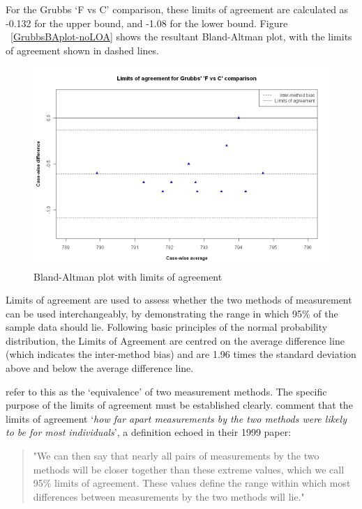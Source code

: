 \documentclass[12pt, a4paper]{report}
\theoremstyle{plain}
\theoremstyle{definition}
\theoremstyle{remark}
\begin{document}
For the Grubbs `F vs C' comparison, these limits
of agreement are calculated as -0.132 for the upper bound, and
-1.08 for the lower bound. Figure ~\ref{GrubbsBAplot-noLOA} shows the resultant
Bland-Altman plot, with the limits of agreement shown in dashed
lines.


\begin{figure}[h!]
	\begin{center}
		\includegraphics[width=125mm]{images/GrubbsBAplot-LOA.jpeg}
		\caption{Bland-Altman plot with limits of agreement}
	\end{center}
\end{figure}

Limits of agreement are used to assess whether the two methods of
measurement can be used interchangeably, by demonstrating the range in which 95\% of the sample data should lie. Following basic principles of the normal probability distribution, the Limits of Agreement are centred on the average difference line (which indicates the inter-method bias) and are 1.96 times the standard deviation
above and below the average difference line.

 \citet{BA86} refer to
this as the `equivalence' of two measurement methods. The specific purpose of the limits of
agreement must be
established clearly. \citet*{BA95} comment that the limits of agreement `\textit{how
	far apart measurements by the two methods were likely to be for
	most individuals}', a definition echoed in their 1999 paper:

\begin{quote}"We can then say that nearly all pairs
	of measurements by the two methods will be closer together than
	these extreme values, which we call 95\% limits of agreement.
	These values define the range within which most differences
	between measurements by the two methods will lie."
\end{quote}
\end{document}
